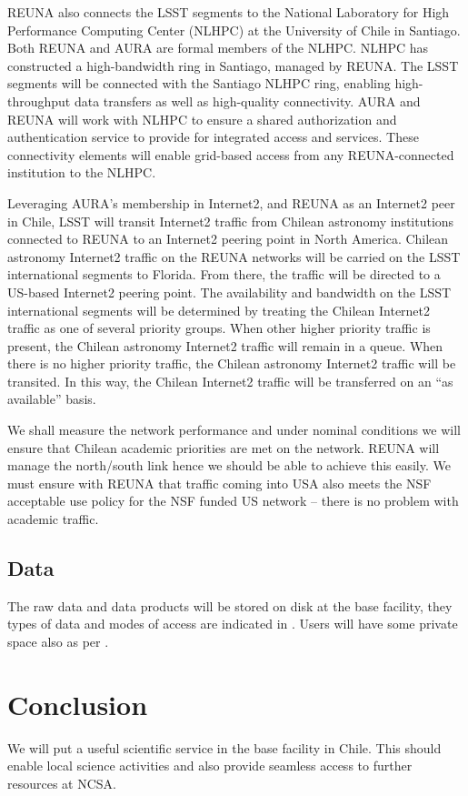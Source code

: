 REUNA also connects the LSST segments to the National Laboratory for High Performance Computing Center (NLHPC) at the University of Chile in Santiago.
Both REUNA and AURA are formal members of the NLHPC.
NLHPC has constructed a high-bandwidth ring in Santiago, managed by REUNA.
The LSST segments will be connected with the Santiago NLHPC ring, enabling high-throughput data transfers as well as high-quality connectivity.
AURA and REUNA will work with NLHPC to ensure a shared authorization and authentication service to provide for integrated access and services.
These connectivity elements will enable grid-based access from any REUNA-connected institution to the NLHPC.

Leveraging AURA’s membership in Internet2, and REUNA as an Internet2 peer in Chile, LSST will transit Internet2 traffic from Chilean astronomy institutions connected to REUNA to an Internet2 peering point in North America.
Chilean astronomy Internet2 traffic on the REUNA networks will be carried on the LSST international segments to Florida.
From there, the traffic will be directed to a US-based Internet2 peering point.
The availability and bandwidth on the LSST international segments will be determined by treating the Chilean Internet2 traffic as one of several priority groups.
When other higher priority traffic is present, the Chilean astronomy Internet2 traffic will remain in a queue.
When there is no higher priority traffic, the Chilean astronomy Internet2 traffic will be transited.
In this way, the Chilean Internet2 traffic will be transferred on an ``as available'' basis.

We shall measure the network performance and under nominal conditions we will ensure that Chilean academic priorities are met on the network.
REUNA will manage the north/south link hence we should be able to achieve this easily.
We must ensure with REUNA that traffic coming into USA also meets the NSF acceptable use policy for the NSF funded US network -- there is no problem with academic traffic.


\subsection{Data}
\label{sec:data}

The raw data and data products will be stored on disk at the base facility, they types of data and modes of access are indicated in . Users will have some private space also as per .




\section{Conclusion}

We will put a useful scientific service in the base facility in Chile.
This should enable local science activities and also provide seamless access to further resources at NCSA.
